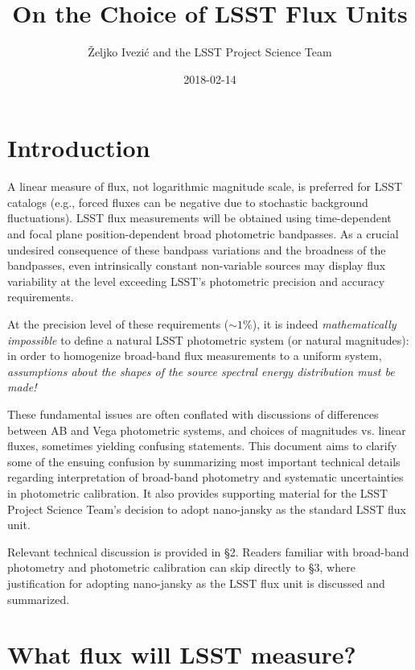 \documentclass[PST,toc]{lsstdoc}
\title[LSST Flux Units]{On the Choice of LSST Flux Units}
\author{\v{Z}eljko Ivezi\'{c} and the LSST Project Science Team}
\date{2018-02-14}
\begin{document}
\maketitle


\section{Introduction}

A linear measure of flux, not logarithmic magnitude scale, is preferred
for LSST catalogs (e.g., forced fluxes can be negative due to stochastic
background fluctuations). LSST flux measurements will be obtained using
time-dependent and focal plane position-dependent broad photometric
bandpasses. As a crucial undesired consequence of these bandpass variations
and the broadness of the bandpasses, even intrinsically constant non-variable
sources may display flux variability at the level exceeding LSST's photometric precision
and accuracy requirements.

At the precision level of these requirements ($\sim1\%$), it is indeed
\textit{mathematically impossible} to define a natural LSST photometric system (or
natural magnitudes): in order to homogenize broad-band flux measurements
to a uniform system, \textit{assumptions about the shapes of the source spectral
energy distribution must be made!}

These fundamental issues are often conflated with discussions of differences
between AB and Vega photometric systems, and choices of magnitudes vs. linear
fluxes, sometimes yielding confusing statements.  This document aims to clarify
some of the ensuing confusion by summarizing most important technical details
regarding interpretation of broad-band photometry and systematic uncertainties in
photometric calibration. It also provides supporting material for the LSST Project
Science Team's decision to adopt nano-jansky as the standard LSST flux unit.

Relevant technical discussion is provided in \S 2. Readers familiar
with broad-band photometry and photometric calibration can skip
directly to \S 3, where justification for adopting nano-jansky
as the LSST flux unit is discussed and summarized.



\section{What flux will LSST measure?}
\end{document}

